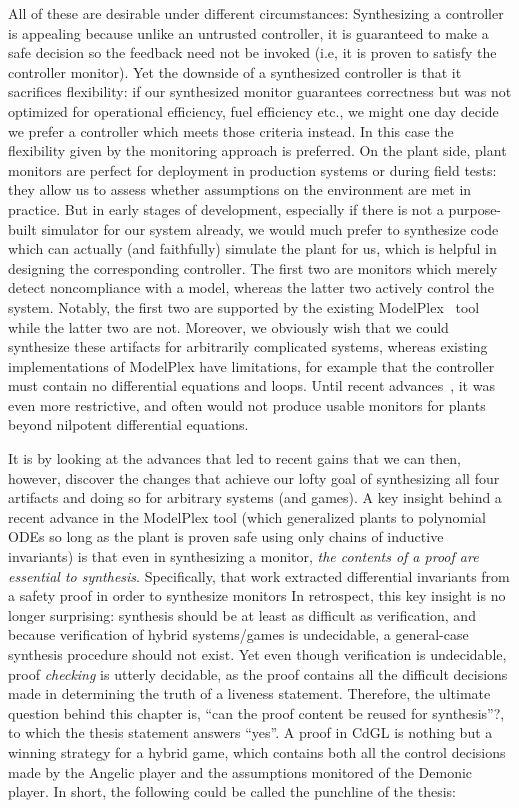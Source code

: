 \documentclass[12pt]{cmuthesis}
\theoremstyle{definition}
\theoremstyle{remark}
\newcommand{\CdGL}{\textsf{CdGL}\xspace}
\newcommand{\ModelPlex}{ModelPlex\xspace}
\begin{document}
All of these are desirable under different circumstances:
Synthesizing a controller is appealing because unlike an untrusted controller, it is guaranteed to make a safe decision so the feedback need not be invoked (i.e, it is proven to satisfy the controller monitor).
Yet the downside of a synthesized controller is that it sacrifices flexibility: if our synthesized monitor guarantees correctness but was not optimized for operational efficiency, fuel efficiency etc., we might one day decide we prefer a controller which meets those criteria instead.
In this case the flexibility given by the monitoring approach is preferred.
On the plant side, plant monitors are perfect for deployment in production systems or during field tests: they allow us to assess whether assumptions on the environment are met in practice.
But in early stages of development, especially if there is not a purpose-built simulator for our system already, we would much prefer to synthesize code which can actually (and faithfully) simulate the plant for us, which is helpful in designing the corresponding controller.
The first two are monitors which merely detect noncompliance with a model, whereas the latter two actively control the system.
Notably, the first two are supported by the existing \ModelPlex~\cite{DBLP:journals/fmsd/MitschP16} tool while the latter two are not.
Moreover, we obviously wish that we could synthesize these artifacts for arbitrarily complicated systems, whereas existing implementations of \ModelPlex have limitations, for example that the controller must contain no differential equations and loops.
Until recent advances~\cite{DBLP:journals/corr/abs-1908-05535}, it was even more restrictive, and often would not produce usable monitors for plants beyond  nilpotent differential equations.

It is by looking at the advances that led to recent gains that we can then, however, discover the changes that achieve our lofty goal of synthesizing all four artifacts and doing so for arbitrary systems (and games).
A key insight behind a recent advance in the \ModelPlex tool (which generalized plants to polynomial ODEs so long as the plant is proven safe using only chains of inductive invariants) is that even in synthesizing a monitor, \emph{the contents of a proof are essential to synthesis}.
Specifically, that work extracted differential invariants from a safety proof in order to synthesize monitors
In retrospect, this key insight is no longer surprising: synthesis should be at least as difficult as verification, and because verification of hybrid systems/games is undecidable, a general-case synthesis procedure should not exist.
Yet even though verification is undecidable, proof \emph{checking} is utterly decidable, as the proof contains all the difficult decisions made in determining the truth of a liveness statement.
Therefore, the ultimate question behind this chapter is, ``can the proof content be reused for synthesis''?, to which the thesis statement answers ``yes''.
A proof in \CdGL is nothing but a winning strategy for a hybrid game, which contains both all the control decisions made by the Angelic player and the assumptions monitored of the Demonic player.
In short, the following could be called the punchline of the thesis:
\end{document}
